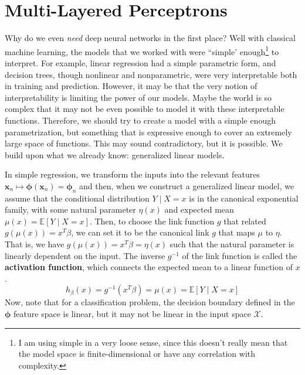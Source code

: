 \section{Multi-Layered Perceptrons} 

  Why do we even \textit{need} deep neural networks in the first place? Well with classical machine learning, the models that we worked with were ``simple' enough\footnote{I am using simple in a very loose sense, since this doesn't really mean that the model space is finite-dimensional or have any correlation with complexity.} to interpret. For example, linear regression had a simple parametric form, and decision trees, though nonlinear and nonparametric, were very interpretable both in training and prediction. However, it may be that the very notion of interpretability is limiting the power of our models. Maybe the world is so complex that it may not be even possible to model it with these interpretable functions. Therefore, we should try to create a model with a simple enough parametrization, but something that is expressive enough to cover an extremely large space of functions. This may sound contradictory, but it is possible. We build upon what we already know: generalized linear models. 

  In simple regression, we transform the inputs into the relevant features $\mathbf{x}_n \mapsto \boldsymbol{\phi} (\mathbf{x}_n) = \boldsymbol{\phi}_n$ and then, when we construct a generalized linear model, we assume that the conditional distribution $Y \mid X = x$ is in the canonical exponential family, with some natural parameter $\eta(x)$ and expected mean $\mu(x) = \mathbb{E}[Y \mid X = x]$. Then, to choose the link function $g$ that related $g(\mu(x)) = x^T \beta$, we can set it to be the canonical link $g$ that maps $\mu$ to $\eta$. That is, we have $g(\mu(x)) = x^T \beta = \eta (x)$ such that the natural parameter is linearly dependent on the input. The inverse $g^{-1}$ of the link function is called the \textbf{activation function}, which connects the expected mean to a linear function of $x$. 
  \begin{equation}
    h_\beta (x) = g^{-1} (x^T \beta) = \mu(x) = \mathbb{E}[Y \mid X = x]
  \end{equation}
  Now, note that for a classification problem, the decision boundary defined in the $\boldsymbol{\phi}$ feature space is linear, but it may not be linear in the input space $\mathcal{X}$. 


